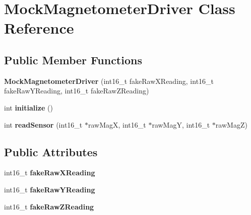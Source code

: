 \hypertarget{class_mock_magnetometer_driver}{\section{Mock\-Magnetometer\-Driver Class Reference}
\label{class_mock_magnetometer_driver}
}
\subsection*{Public Member Functions}
\begin{DoxyCompactItemize}
\item 
\hypertarget{class_mock_magnetometer_driver_a3c302e4bf978511c7cece6b5d6b37868}{{\bfseries Mock\-Magnetometer\-Driver} (int16\-\_\-t fake\-Raw\-X\-Reading, int16\-\_\-t fake\-Raw\-Y\-Reading, int16\-\_\-t fake\-Raw\-Z\-Reading)}\label{class_mock_magnetometer_driver_a3c302e4bf978511c7cece6b5d6b37868}

\item 
\hypertarget{class_mock_magnetometer_driver_a6ac7c1c2eca33dc976d28e18bfde0a90}{int {\bfseries initialize} ()}\label{class_mock_magnetometer_driver_a6ac7c1c2eca33dc976d28e18bfde0a90}

\item 
\hypertarget{class_mock_magnetometer_driver_a7310ac9b4ea476bd5237e7192f66e516}{int {\bfseries read\-Sensor} (int16\-\_\-t $\ast$raw\-Mag\-X, int16\-\_\-t $\ast$raw\-Mag\-Y, int16\-\_\-t $\ast$raw\-Mag\-Z)}\label{class_mock_magnetometer_driver_a7310ac9b4ea476bd5237e7192f66e516}

\end{DoxyCompactItemize}
\subsection*{Public Attributes}
\begin{DoxyCompactItemize}
\item 
\hypertarget{class_mock_magnetometer_driver_a9fa12f9bda2c655dca138af229fdd416}{int16\-\_\-t {\bfseries fake\-Raw\-X\-Reading}}\label{class_mock_magnetometer_driver_a9fa12f9bda2c655dca138af229fdd416}

\item 
\hypertarget{class_mock_magnetometer_driver_ae8c6a36d7938892b0735620e4ba46bb9}{int16\-\_\-t {\bfseries fake\-Raw\-Y\-Reading}}\label{class_mock_magnetometer_driver_ae8c6a36d7938892b0735620e4ba46bb9}

\item 
\hypertarget{class_mock_magnetometer_driver_accaf78ab9adca9688f657bb357f6a292}{int16\-\_\-t {\bfseries fake\-Raw\-Z\-Reading}}\label{class_mock_magnetometer_driver_accaf78ab9adca9688f657bb357f6a292}

\end{DoxyCompactItemize}


